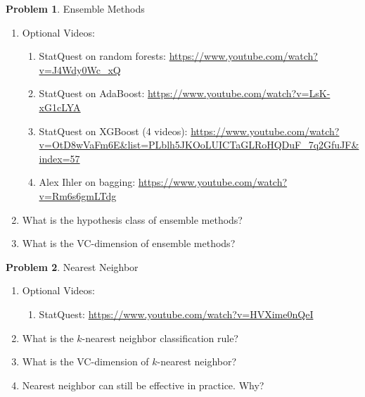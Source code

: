 \documentclass[10pt]{article}
\theoremstyle{definition}
\newtheorem{problem}{Problem}
\begin{document}
\newpage
\begin{problem}
    Ensemble Methods
    \begin{enumerate}
        \item Optional Videos:
            \begin{enumerate}
                \item StatQuest on random forests: \url{https://www.youtube.com/watch?v=J4Wdy0Wc_xQ}
                \item StatQuest on AdaBoost: \url{https://www.youtube.com/watch?v=LsK-xG1cLYA}
                \item StatQuest on XGBoost (4 videos): \url{https://www.youtube.com/watch?v=OtD8wVaFm6E&list=PLblh5JKOoLUICTaGLRoHQDuF_7q2GfuJF&index=57}
                \item Alex Ihler on bagging: \url{https://www.youtube.com/watch?v=Rm6s6gmLTdg}
            \end{enumerate}
        \item What is the hypothesis class of ensemble methods?
            \vspace{3in}
        \item What is the VC-dimension of ensemble methods?
            \vspace{3in}
    \end{enumerate}
\end{problem}

\newpage
\begin{problem}
    Nearest Neighbor
    \begin{enumerate}
        \item Optional Videos:
            \begin{enumerate}
                \item StatQuest: \url{https://www.youtube.com/watch?v=HVXime0nQeI}
            \end{enumerate}
        \item What is the $k$-nearest neighbor classification rule?
            \vspace{3in}
        \item What is the VC-dimension of $k$-nearest neighbor?
            \vspace{3in}
        \item Nearest neighbor can still be effective in practice.  Why?
    \end{enumerate}
\end{problem}

\end{document}
